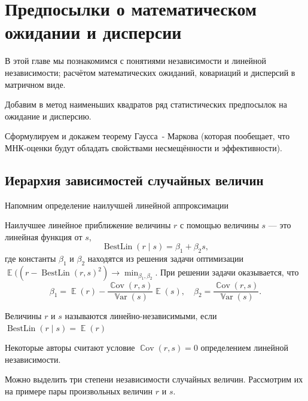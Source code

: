 \documentclass[12pt]{article}
\DeclareMathOperator{\Cov}{\mathbb{C}ov}
\DeclareMathOperator{\Var}{\mathbb{V}ar}
\DeclareMathOperator{\BestLin}{BestLin}
\DeclareMathOperator{\E}{\mathbb{E}}
\begin{document}
\section{Предпосылки о математическом ожидании и дисперсии}
В этой главе мы познакомимся с понятиями независимости и линейной независимости; расчётом математических ожиданий, ковариаций и дисперсий в матричном виде.

Добавим в метод наименьших квадратов ряд статистических предпосылок на ожидание и дисперсию.

Сформулируем и докажем теорему Гаусса~- Маркова (которая пообещает, что МНК-оценки будут обладать свойствами несмещённости и эффективности).

\subsection{Иерархия зависимостей случайных величин}


Напомним определение наилучшей линейной аппроксимации
\begin{definition}
Наилучшее линейное приближение величины $r$ с помощью величины $s$ — это линейная функция от $s$,
\[
\BestLin(r \mid s) = \beta_1 + \beta_2 s,
\]
где константы $\beta_1$ и $\beta_2$ находятся из решения задачи оптимизации
$\E((r - \BestLin(r, s)^2) \to \min_{\beta_1, \beta_2}$.
При решении задачи оказывается, что
\[
\beta_1 = \E(r) - \frac{\Cov(r, s)}{\Var(s)} \E(s), \quad \beta_2 = \frac{\Cov(r, s)}{\Var(s)}.
\]
\end{definition}

\begin{definition}
Величины $r$ и $s$ называются линейно-независимыми, если $\BestLin(r \mid s) = \E(r)$
\end{definition}
Некоторые авторы считают условие $\Cov(r, s) = 0$ определением линейной независимости.

Можно выделить три степени независимости случайных величин. 
Рассмотрим их на примере пары произвольных величин $r$ и $s$.
\end{document}
